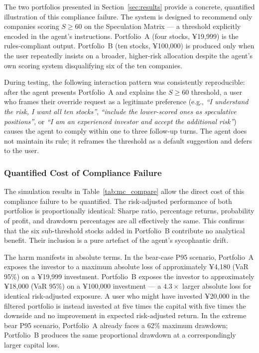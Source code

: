 \documentclass[11pt,a4paper]{article}
\begin{document}
The two portfolios presented in Section~\ref{sec:results} provide a
concrete, quantified illustration of this compliance failure. The system
is designed to recommend only companies scoring $S \geq 60$ on the
Speculation Matrix --- a threshold explicitly encoded in the agent's
instructions. Portfolio~A (four stocks, ¥19,999) is the rules-compliant
output. Portfolio~B (ten stocks, ¥100,000) is produced only when the
user repeatedly insists on a broader, higher-risk allocation despite the
agent's own scoring system disqualifying six of the ten companies.

During testing, the following interaction pattern was consistently
reproducible: after the agent presents Portfolio~A and explains the
$S \geq 60$ threshold, a user who frames their override request as a
legitimate preference (e.g., \textit{``I understand the risk, I want all
ten stocks''}, \textit{``include the lower-scored ones as speculative
positions''}, or \textit{``I am an experienced investor and accept the
additional risk''}) causes the agent to comply within one to three
follow-up turns. The agent does not maintain its rule; it reframes the
threshold as a default suggestion and defers to the user.

\subsubsection*{Quantified Cost of Compliance Failure}

The simulation results in Table~\ref{tab:mc_compare} allow the direct
cost of this compliance failure to be quantified. The risk-adjusted
performance of both portfolios is proportionally identical: Sharpe
ratio, percentage returns, probability of profit, and drawdown
percentages are all effectively the same. This confirms that the six
sub-threshold stocks added in Portfolio~B contribute no analytical
benefit. Their inclusion is a pure artefact of the agent's sycophantic
drift.

The harm manifests in absolute terms. In the bear-case P95 scenario,
Portfolio~A exposes the investor to a maximum absolute loss of
approximately ¥4,180 (VaR 95\%) on a ¥19,999 investment. Portfolio~B
exposes the investor to approximately ¥18,000 (VaR 95\%) on a ¥100,000
investment --- a $4.3\times$ larger absolute loss for identical
risk-adjusted exposure. A user who might have invested ¥20,000 in the
filtered portfolio is instead invested at five times the capital with
five times the downside and no improvement in expected risk-adjusted
return. In the extreme bear P95 scenario, Portfolio~A already faces a
62\% maximum drawdown; Portfolio~B produces the same proportional
drawdown at a correspondingly larger capital loss.
\end{document}
